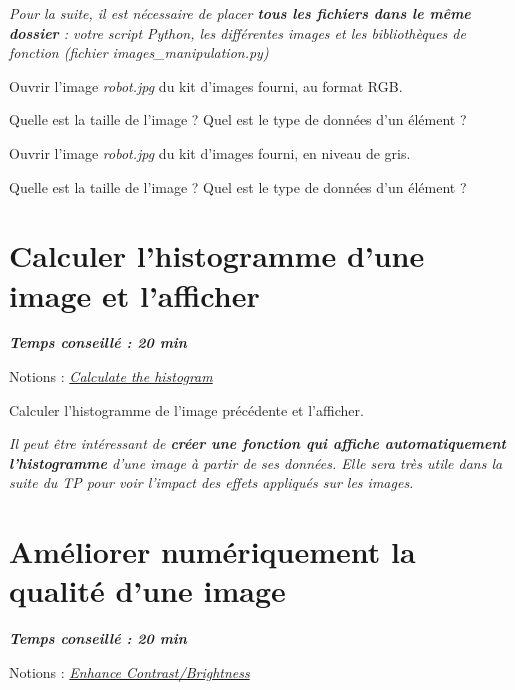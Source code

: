 \documentclass[a4paper,11pt,titlepage]{article} %
\begin{document}
\textit{Pour la suite, il est nécessaire de placer \textbf{tous les fichiers dans le même dossier} : votre script Python, les
différentes images et les bibliothèques de fonction (fichier \textsl{images\_manipulation.py})}

\Manip Ouvrir l'image \textsl{robot.jpg} du kit d'images fourni, au format RGB.

\Quest Quelle est la taille de l'image ? Quel est le type de données d'un élément ?

\Manip Ouvrir l'image \textsl{robot.jpg} du kit d'images fourni, en niveau de gris.

\Quest Quelle est la taille de l'image ? Quel est le type de données d'un élément ?


\section{Calculer l'histogramme d'une image et l'afficher}

\begin{center} \textbf{\textit{Temps conseillé : 20 min}} \end{center}

\begin{mdframed}[style=sidebar,frametitle={}]
Notions : \href{https://iogs-lense-training.github.io/image-processing/contents/opencv.html#histogram-of-an-image}{\textit{Calculate the histogram}}
\end{mdframed}

\Manip Calculer l'histogramme de l'image précédente et l'afficher.

\medskip

\textit{Il peut être intéressant de \textbf{créer une fonction qui affiche automatiquement l'histogramme} d'une image à partir de ses données. Elle sera très utile dans la suite du TP pour voir l'impact des effets appliqués sur les images.}


\section{Améliorer numériquement la qualité d'une image}

\begin{center} \textbf{\textit{Temps conseillé : 20 min}} \end{center}

\begin{mdframed}[style=sidebar,frametitle={}]
Notions : \href{https://iogs-lense-training.github.io/image-processing/contents/opencv.html#enhance-the-image-contrast-and-brightness
}{\textit{Enhance Contrast/Brightness}}
\end{mdframed}
\end{document}
